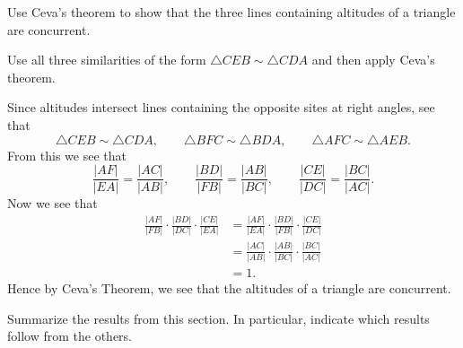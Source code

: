 \documentclass[newpage,hints,handout,nooutcomes,noauthor,12pt]{ximera}
\begin{document}
\begin{problem}
Use Ceva's theorem to show that the three lines containing altitudes
of a triangle are concurrent.
\begin{image}
\end{image}
\begin{hint}
Use all three similarities of the form $\triangle CEB\sim\triangle
CDA$ and then apply Ceva's theorem.
\end{hint}
\begin{freeResponse}
Since altitudes intersect lines containing the opposite sites at right
angles, see that 
\[
\triangle CEB\sim\triangle CDA,\qquad 
\triangle BFC \sim \triangle BDA,\qquad
\triangle AFC \sim \triangle AEB.
\]
From this we see that 
\[
\frac{|AF|}{|EA|}=\frac{|AC|}{|AB|},\qquad
\frac{|BD|}{|FB|}=\frac{|AB|}{|BC|},\qquad
\frac{|CE|}{|DC|}=\frac{|BC|}{|AC|}.
\]
Now we see that 
\begin{align*}
\frac{|AF|}{|FB|}\cdot\frac{|BD|}{|DC|}\cdot\frac{|CE|}{|EA|} &= 
\frac{|AF|}{|EA|}\cdot\frac{|BD|}{|FB|}\cdot\frac{|CE|}{|DC|}\\
&=\frac{|AC|}{|AB|}\cdot\frac{|AB|}{|BC|}\cdot\frac{|BC|}{|AC|}\\
&= 1.
\end{align*}
Hence by Ceva's Theorem, we see that the altitudes of a triangle are
concurrent.
\end{freeResponse}
\end{problem}

\begin{problem}
Summarize the results from this section. In particular, indicate which
results follow from the others.
\begin{freeResponse}
\end{freeResponse}
\end{problem}
\end{document}

